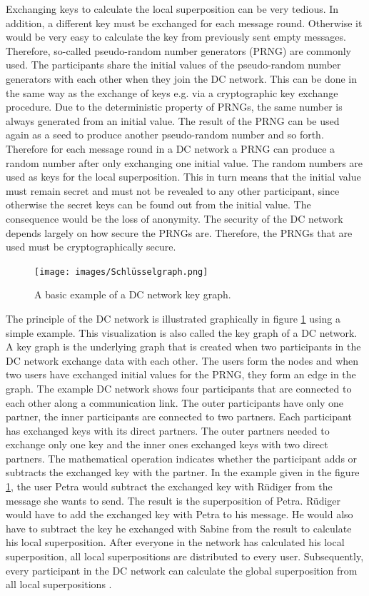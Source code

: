 Exchanging keys to calculate the local superposition can be very tedious. In addition, a different key must be exchanged for each message round. Otherwise it would be very easy to calculate the key from previously sent empty messages. Therefore, so-called pseudo-random number generators (PRNG) are commonly used. The participants share the initial values of the pseudo-random number generators with each other when they join the DC network. This can be done in the same way as the exchange of keys e.g. via a cryptographic key exchange procedure. Due to the deterministic property of PRNGs, the same number is always generated from an initial value. The result of the PRNG can be used again as a seed to produce another pseudo-random number and so forth. Therefore for each message round in a DC network a PRNG can produce a random number after only exchanging one initial value. The random numbers are used as keys for the local superposition. This in turn means that the initial value must remain secret and must not be revealed to any other participant, since otherwise the secret keys can be found out from the initial value. The consequence would be the loss of anonymity. The security of the DC network depends largely on how secure the PRNGs are. Therefore, the PRNGs that are used must be cryptographically secure.\\
\begin{figure}[tbp]
  \centering
  \texttt{[image: images/Schlüsselgraph.png]}
  \caption[DC Network Key Graph]{A basic example of a DC network key graph\cite{stephan_escher}.}
  \label{fig:keygraph}
\end{figure}
The principle of the DC network is illustrated graphically in figure \ref{fig:keygraph} using a simple example. This visualization is also called the key graph of a DC network. A key graph is the underlying graph that is created when two participants in the DC network exchange data with each other. The users form the nodes and when two users have exchanged initial values for the PRNG, they form an edge in the graph. The example DC network shows four participants that are connected to each other along a communication link. The outer participants have only one partner, the inner participants are connected to two partners. Each participant has exchanged keys with its direct partners. The outer partners needed to exchange only one key and the inner ones exchanged keys with two direct partners.
The mathematical operation indicates whether the participant adds or subtracts the exchanged key with the partner. In the example given in the figure \ref{fig:keygraph}, the user Petra would subtract the exchanged key with Rüdiger from the message she wants to send. The result is the superposition of Petra. Rüdiger would have to add the exchanged key with Petra to his message. He would also have to subtract the key he exchanged with Sabine from the result to calculate his local superposition. After everyone in the network has calculated his local superposition, all local superpositions are distributed to every user. Subsequently, every participant in the DC network can calculate the global superposition from all local superpositions \cite{stephan_escher}\cite{pfitzmann2006security}.

